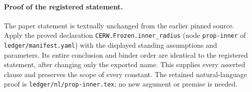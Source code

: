 \paragraph{Proof of the registered statement.}
The paper statement is textually unchanged from the earlier pinned source.
Apply the proved declaration \texttt{CERW.Frozen.inner\_radius}
(node \texttt{prop-inner} of \texttt{ledger/manifest.yaml}) with the displayed
standing assumptions and parameters. Its entire conclusion and binder order
are identical to the registered statement, after changing only the exported
name. This supplies every asserted clause and preserves the scope of every
constant. The retained natural-language proof is
\texttt{ledger/nl/prop-inner.tex}; no new argument or premise is needed.

